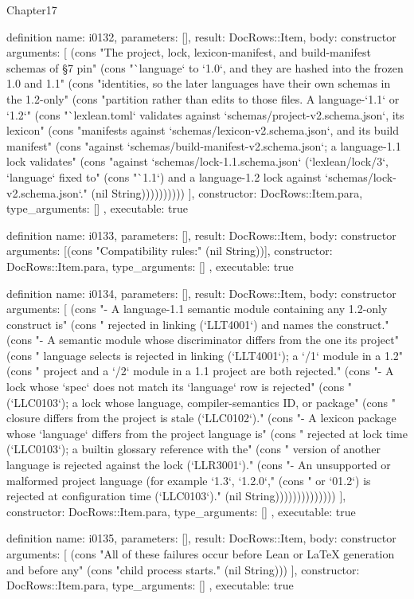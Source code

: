 \begin{lexlean}{Chapter17}
\begin{semanticmodule}
definition{
  name: i0132,
  parameters: [],
  result: DocRows::Item,
  body: constructor{
    arguments: [
      (cons "The project, lock, lexicon-manifest, and build-manifest schemas of §7 pin" (cons "`language` to `1.0`, and they are hashed into the frozen 1.0 and 1.1" (cons "identities, so the later languages have their own schemas in the 1.2-only" (cons "partition rather than edits to those files. A language-`1.1` or `1.2`" (cons "`lexlean.toml` validates against `schemas/project-v2.schema.json`, its lexicon" (cons "manifests against `schemas/lexicon-v2.schema.json`, and its build manifest" (cons "against `schemas/build-manifest-v2.schema.json`; a language-1.1 lock validates" (cons "against `schemas/lock-1.1.schema.json` (`lexlean/lock/3`, `language` fixed to" (cons "`1.1`) and a language-1.2 lock against `schemas/lock-v2.schema.json`." (nil String))))))))))
    ],
    constructor: DocRows::Item.para,
    type_arguments: []
  },
  executable: true
}

definition{
  name: i0133,
  parameters: [],
  result: DocRows::Item,
  body: constructor{
    arguments: [(cons "Compatibility rules:" (nil String))],
    constructor: DocRows::Item.para,
    type_arguments: []
  },
  executable: true
}

definition{
  name: i0134,
  parameters: [],
  result: DocRows::Item,
  body: constructor{
    arguments: [
      (cons "- A language-1.1 semantic module containing any 1.2-only construct is" (cons "  rejected in linking (`LLT4001`) and names the construct." (cons "- A semantic module whose discriminator differs from the one its project" (cons "  language selects is rejected in linking (`LLT4001`); a `/1` module in a 1.2" (cons "  project and a `/2` module in a 1.1 project are both rejected." (cons "- A lock whose `spec` does not match its `language` row is rejected" (cons "  (`LLC0103`); a lock whose language, compiler-semantics ID, or package" (cons "  closure differs from the project is stale (`LLC0102`)." (cons "- A lexicon package whose `language` differs from the project language is" (cons "  rejected at lock time (`LLC0103`); a builtin glossary reference with the" (cons "  version of another language is rejected against the lock (`LLR3001`)." (cons "- An unsupported or malformed project language (for example `1.3`, `1.2.0`," (cons "  or `01.2`) is rejected at configuration time (`LLC0103`)." (nil String))))))))))))))
    ],
    constructor: DocRows::Item.para,
    type_arguments: []
  },
  executable: true
}

definition{
  name: i0135,
  parameters: [],
  result: DocRows::Item,
  body: constructor{
    arguments: [
      (cons "All of these failures occur before Lean or LaTeX generation and before any" (cons "child process starts." (nil String)))
    ],
    constructor: DocRows::Item.para,
    type_arguments: []
  },
  executable: true
}


\end{semanticmodule}
\end{lexlean}
